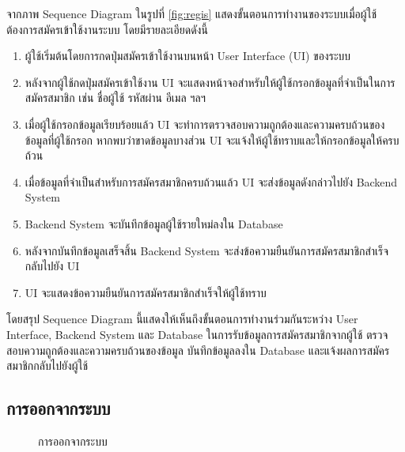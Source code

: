 \documentclass[14pt,oneside,openright,a4paper]{cpe-thai-project}
\begin{document}
จากภาพ Sequence Diagram ในรูปที่ \ref{fig:regis} แสดงขั้นตอนการทำงานของระบบเมื่อผู้ใช้ต้องการสมัครเข้าใช้งานระบบ โดยมีรายละเอียดดังนี้
\begin{enumerate}
  \item ผู้ใช้เริ่มต้นโดยการกดปุ่มสมัครเข้าใช้งานบนหน้า User Interface (UI) ของระบบ
  \item หลังจากผู้ใช้กดปุ่มสมัครเข้าใช้งาน UI จะแสดงหน้าจอสำหรับให้ผู้ใช้กรอกข้อมูลที่จำเป็นในการสมัครสมาชิก เช่น ชื่อผู้ใช้ รหัสผ่าน อีเมล ฯลฯ
  \item เมื่อผู้ใช้กรอกข้อมูลเรียบร้อยแล้ว UI จะทำการตรวจสอบความถูกต้องและความครบถ้วนของข้อมูลที่ผู้ใช้กรอก หากพบว่าขาดข้อมูลบางส่วน UI จะแจ้งให้ผู้ใช้ทราบและให้กรอกข้อมูลให้ครบถ้วน
  \item เมื่อข้อมูลที่จำเป็นสำหรับการสมัครสมาชิกครบถ้วนแล้ว UI จะส่งข้อมูลดังกล่าวไปยัง Backend System
  \item Backend System จะบันทึกข้อมูลผู้ใช้รายใหม่ลงใน Database
  \item หลังจากบันทึกข้อมูลเสร็จสิ้น Backend System จะส่งข้อความยืนยันการสมัครสมาชิกสำเร็จกลับไปยัง UI
  \item UI จะแสดงข้อความยืนยันการสมัครสมาชิกสำเร็จให้ผู้ใช้ทราบ
\end{enumerate}
โดยสรุป Sequence Diagram นี้แสดงให้เห็นถึงขั้นตอนการทำงานร่วมกันระหว่าง User Interface, Backend System และ Database ในการรับข้อมูลการสมัครสมาชิกจากผู้ใช้ ตรวจสอบความถูกต้องและความครบถ้วนของข้อมูล บันทึกข้อมูลลงใน Database และแจ้งผลการสมัครสมาชิกกลับไปยังผู้ใช้

\subsection{การออกจากระบบ}

  \begin{figure}[!h]\centering
    \setlength{\fboxrule}{0.5mm} %
    \setlength{\fboxsep}{0.5cm}
    \caption{การออกจากระบบ}\label{fig:logout}
  \end{figure} 
\end{document}
